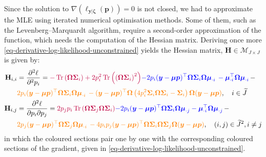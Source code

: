 \documentclass[pdflatex, sn-nature]{sn-jnl}
\theoremstyle{thmstyleone}%
\theoremstyle{thmstyletwo}%
\theoremstyle{thmstylethree}%
\begin{document}
    Since the solution to $\nabla \left( \ell_{\boldsymbol{y} | \boldsymbol{\zeta}}
    (\boldsymbol{p}) \right) =0$ is not closed, we had to approximate the MLE
    using iterated numerical optimisation methods. Some of them, such as the
    Levenberg–Marquardt algorithm, require a second-order approximation of the function,
    which needs the computation of the Hessian matrix. Deriving once more \ref{eq-derivative-log-likelihood-unconstrained}
    yields the Hessian matrix, $\mathbf{H}\in \mathcal{M}_{J \times J}$ is given
    by:
    \begin{equation}
        \label{eq-hessian-log-likelihood-unconstrained}
        \begin{aligned}
            \mathbf{H}_{i,i} & = \frac{\partial^2 \ell}{\partial^2 p_i}= \textcolor{purple}{-\operatorname*{Tr} \left(\boldsymbol{\Omega}\boldsymbol{\Sigma}_i\right) + 2p_i^2 \operatorname*{Tr} \left(\left(\boldsymbol{\Omega}\boldsymbol{\Sigma}_i\right)^2\right)}\textcolor{blue}{-2p_i(\boldsymbol{y} - \boldsymbol{\mu} \boldsymbol{p})^\top\boldsymbol{\Omega} \boldsymbol{\Sigma}_i \boldsymbol{\Omega} \boldsymbol{\mu}_{\cdot i}\, - \boldsymbol{\mu}_{\cdot i}^\top\boldsymbol{\Omega} \boldsymbol{\mu}_{\cdot i}}\, -        \\
                             & \textcolor{orange}{2p_i (\boldsymbol{y} - \boldsymbol{\mu} \boldsymbol{p})^\top \boldsymbol{\Omega}\boldsymbol{\Sigma}_i\boldsymbol{\Omega}\boldsymbol{\mu}_{\cdot i} \, - (\boldsymbol{y} - \boldsymbol{\mu} \boldsymbol{p})^\top\boldsymbol{\Omega} \left(4p_i^2 \boldsymbol{\Sigma}_i \boldsymbol{\Omega} \boldsymbol{\Sigma}_i - \boldsymbol{\Sigma}_i \right)\boldsymbol{\Omega} (\boldsymbol{y} - \boldsymbol{\mu} \boldsymbol{p})}, \quad i \in \widetilde{J} \\
            \mathbf{H}_{i,j} & = \frac{\partial^2 \ell}{\partial p_i \partial p_j}= \textcolor{purple}{2p_j p_i \operatorname*{Tr} \left(\boldsymbol{\Omega}\boldsymbol{\Sigma}_j \boldsymbol{\Omega}\boldsymbol{\Sigma}_i \right)}\textcolor{blue}{-2p_i(\boldsymbol{y} - \boldsymbol{\mu} \boldsymbol{p})^\top\boldsymbol{\Omega} \boldsymbol{\Sigma}_i \boldsymbol{\Omega} \boldsymbol{\mu}_{\cdot j} - \boldsymbol{\mu}_{\cdot i}^\top\boldsymbol{\Omega} \boldsymbol{\mu}_{\cdot j}}\, -                                \\
                             & \textcolor{orange}{2p_j (\boldsymbol{y} - \boldsymbol{\mu} \boldsymbol{p})^\top \boldsymbol{\Omega}\boldsymbol{\Sigma}_j\boldsymbol{\Omega} \boldsymbol{\mu}_{\cdot i}\, - 4p_ip_j(\boldsymbol{y} - \boldsymbol{\mu} \boldsymbol{p})^\top\boldsymbol{\Omega}\boldsymbol{\Sigma}_i \boldsymbol{\Omega} \boldsymbol{\Sigma}_j \boldsymbol{\Omega} (\boldsymbol{y} - \boldsymbol{\mu} \boldsymbol{p})}, \quad (i,j) \in \widetilde{J}^{2}, i \neq j
        \end{aligned}
    \end{equation}
    in which the coloured sections pair one by one with the corresponding coloured
    sections of the gradient, given in
    \ref{eq-derivative-log-likelihood-unconstrained}.
\end{document}
